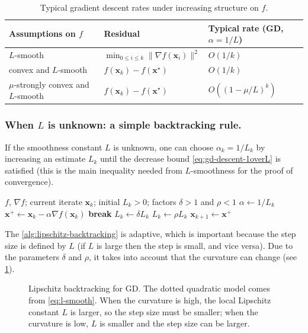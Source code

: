 \begin{table}[ht]
  \centering
  \begin{tabular}{@{}lll@{}}
    \toprule
    Assumptions on $f$ & Residual & Typical rate (GD, $\alpha=1/L$) \\
    \midrule
    $L$-smooth & $\min_{0\le i\le k}\|\nabla f(\mathbf{x}_i)\|^2$ & $O(1/k)$ \\
    convex and $L$-smooth & $f(\mathbf{x}_k)-f(\mathbf{x}^\star)$ & $O(1/k)$ \\
    $\mu$-strongly convex and $L$-smooth & $f(\mathbf{x}_k)-f(\mathbf{x}^\star)$ & $O((1-\mu/L)^k)$ \\
    \bottomrule
  \end{tabular}
  \caption{Typical gradient descent rates under increasing structure on $f$.}
  \label{tab:gd-rates}
\end{table}

\subsubsection{When \texorpdfstring{$L$}{L} is unknown: a simple backtracking rule.}
If the smoothness constant $L$ is unknown, one can choose $\alpha_k=1/L_k$ by
increasing an estimate $L_k$ until the decrease bound
\eqref{eq:gd-descent-1overL} is satisfied (this is the main inequality needed from $L$-smoothness for the
proof of convergence).
\begin{algorithm}[h]
  \caption{\textsc{Lipschitz backtracking} for gradient descent}
  \label{alg:lipschitz-backtracking}
  \begin{algorithmic}
    \REQUIRE $f$, $\nabla f$; current iterate $\mathbf{x}_k$; initial $L_k>0$; factors $\delta>1$
    and $\rho <1$
      \STATE $\alpha\gets 1/L_k$
      \STATE $\mathbf{x}^+\gets \mathbf{x}_k-\alpha \nabla f(\mathbf{x}_k)$
        \STATE \textbf{break}
      \ENDIF
      \STATE $L_k\gets \delta L_k$
    \ENDWHILE
    \STATE $L_k\gets \rho L_k$
    \RETURN $\mathbf{x}_{k+1}\gets \mathbf{x}^+$
  \end{algorithmic}
\end{algorithm}

The \cref{alg:lipschitz-backtracking} is adaptive, which is important because the step size is defined by $L$
(if $L$ is large then the step is small, and vice versa). Due to the parameters
$\delta$ and $\rho$, it takes into account that the curvature can change
(see \cref{fig:backtracking-for-gd}). 
\begin{figure}[ht]
    \centering
    \caption{Lipschitz backtracking for GD. The dotted quadratic model comes from \cref{eq:l-smooth}.
    When the curvature is high, the local Lipschitz constant $L$ is larger, so the step size
    must be smaller; when the curvature is low, $L$ is smaller and the step size can be larger.}
    \label{fig:backtracking-for-gd}
\end{figure}

